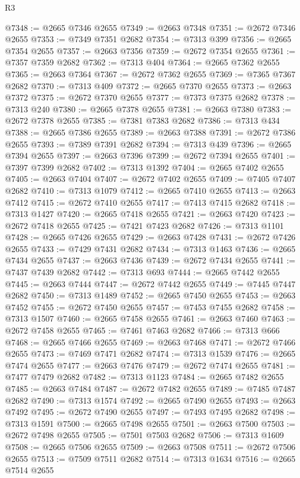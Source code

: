 \begin{lexlean}{R3}
\begin{coremodule}
@7348 := @2665 @7346 @2655
@7349 := @2663 @7348
@7351 := @2672 @7346 @2655
@7353 := @7349 @7351 @2682
@7354 := @7313 @399
@7356 := @2665 @7354 @2655
@7357 := @2663 @7356
@7359 := @2672 @7354 @2655
@7361 := @7357 @7359 @2682
@7362 := @7313 @404
@7364 := @2665 @7362 @2655
@7365 := @2663 @7364
@7367 := @2672 @7362 @2655
@7369 := @7365 @7367 @2682
@7370 := @7313 @409
@7372 := @2665 @7370 @2655
@7373 := @2663 @7372
@7375 := @2672 @7370 @2655
@7377 := @7373 @7375 @2682
@7378 := @7313 @240
@7380 := @2665 @7378 @2655
@7381 := @2663 @7380
@7383 := @2672 @7378 @2655
@7385 := @7381 @7383 @2682
@7386 := @7313 @434
@7388 := @2665 @7386 @2655
@7389 := @2663 @7388
@7391 := @2672 @7386 @2655
@7393 := @7389 @7391 @2682
@7394 := @7313 @439
@7396 := @2665 @7394 @2655
@7397 := @2663 @7396
@7399 := @2672 @7394 @2655
@7401 := @7397 @7399 @2682
@7402 := @7313 @1392
@7404 := @2665 @7402 @2655
@7405 := @2663 @7404
@7407 := @2672 @7402 @2655
@7409 := @7405 @7407 @2682
@7410 := @7313 @1079
@7412 := @2665 @7410 @2655
@7413 := @2663 @7412
@7415 := @2672 @7410 @2655
@7417 := @7413 @7415 @2682
@7418 := @7313 @1427
@7420 := @2665 @7418 @2655
@7421 := @2663 @7420
@7423 := @2672 @7418 @2655
@7425 := @7421 @7423 @2682
@7426 := @7313 @1101
@7428 := @2665 @7426 @2655
@7429 := @2663 @7428
@7431 := @2672 @7426 @2655
@7433 := @7429 @7431 @2682
@7434 := @7313 @1463
@7436 := @2665 @7434 @2655
@7437 := @2663 @7436
@7439 := @2672 @7434 @2655
@7441 := @7437 @7439 @2682
@7442 := @7313 @693
@7444 := @2665 @7442 @2655
@7445 := @2663 @7444
@7447 := @2672 @7442 @2655
@7449 := @7445 @7447 @2682
@7450 := @7313 @1489
@7452 := @2665 @7450 @2655
@7453 := @2663 @7452
@7455 := @2672 @7450 @2655
@7457 := @7453 @7455 @2682
@7458 := @7313 @1507
@7460 := @2665 @7458 @2655
@7461 := @2663 @7460
@7463 := @2672 @7458 @2655
@7465 := @7461 @7463 @2682
@7466 := @7313 @666
@7468 := @2665 @7466 @2655
@7469 := @2663 @7468
@7471 := @2672 @7466 @2655
@7473 := @7469 @7471 @2682
@7474 := @7313 @1539
@7476 := @2665 @7474 @2655
@7477 := @2663 @7476
@7479 := @2672 @7474 @2655
@7481 := @7477 @7479 @2682
@7482 := @7313 @1123
@7484 := @2665 @7482 @2655
@7485 := @2663 @7484
@7487 := @2672 @7482 @2655
@7489 := @7485 @7487 @2682
@7490 := @7313 @1574
@7492 := @2665 @7490 @2655
@7493 := @2663 @7492
@7495 := @2672 @7490 @2655
@7497 := @7493 @7495 @2682
@7498 := @7313 @1591
@7500 := @2665 @7498 @2655
@7501 := @2663 @7500
@7503 := @2672 @7498 @2655
@7505 := @7501 @7503 @2682
@7506 := @7313 @1609
@7508 := @2665 @7506 @2655
@7509 := @2663 @7508
@7511 := @2672 @7506 @2655
@7513 := @7509 @7511 @2682
@7514 := @7313 @1634
@7516 := @2665 @7514 @2655

\end{coremodule}
\end{lexlean}
